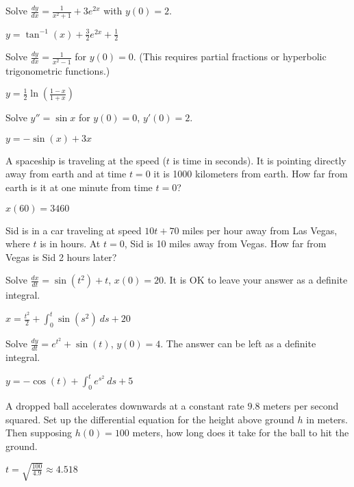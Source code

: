 \begin{exercise}
Solve $\frac{dy}{dx} = \frac{1}{x^2 + 1} + 3e^{2x}$ with $y(0) =2$. 
\end{exercise}
\comboSol{%
}
{%
$y = \tan^{-1}(x) + \frac{3}{2}e^{2x} + \frac{1}{2}$
}

\begin{exercise}
Solve $\frac{dy}{dx} = \frac{1}{x^2-1}$ for $y(0)=0$. (This requires partial fractions or hyperbolic trigonometric functions.)
\end{exercise}
\comboSol{%
}
{%
$y = \frac{1}{2}\ln\left(\frac{1-x}{1+x}\right)$
}

\begin{exercise}[harder]
Solve $y'' = \sin x$ for $y(0)=0$, $y'(0) = 2$.
\end{exercise}
\comboSol{%
}
{%
$y = -\sin(x) + 3x$
}

\begin{exercise}
A spaceship is traveling at the speed  ($t$ is
time in seconds).  It is pointing directly away from earth and at time $t=0$
it is 1000 kilometers from earth.  How far from earth is it at one minute from
time $t=0$?
\end{exercise}
\comboSol{%
}
{%
$x(60) = 3460$
}

\begin{exercise}\ansMark
Sid is in a car traveling at speed $10t+70$ miles per hour away from Las Vegas,
where $t$ is in hours.  At $t=0$, Sid is 10 miles away from Vegas.  How
far from Vegas is Sid 2 hours later?
\end{exercise}

\begin{exercise}
Solve $\frac{dx}{dt} = \sin(t^2)+t$, $x(0)=20$.  It is OK to leave your
answer as a definite integral.
\end{exercise}
\comboSol{%
}
{%
$x = \frac{t^2}{2} + \int_0^t \sin(s^2)\ ds + 20$
}

\begin{exercise}
Solve $\frac{dy}{dt} = e^{t^2} + \sin(t)$, $y(0) = 4$. The answer can be left as a definite integral. 
\end{exercise}
\comboSol{%
}
{%
$y = -\cos(t) + \int_0^t e^{s^2}\ ds + 5$
}

\begin{exercise}
A dropped ball accelerates downwards at a constant rate $9.8$ meters per second
squared.  Set up the differential equation for the height above ground $h$ in meters.
Then supposing $h(0) = 100$ meters, how long does it take for the ball to hit
the ground.
\end{exercise}
\comboSol{%
}
{%
$t = \sqrt{\frac{100}{4.9}} \approx 4.518$
}


